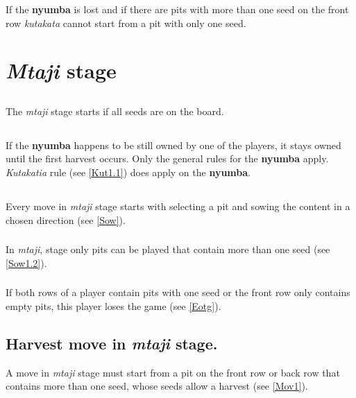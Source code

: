 \documentclass[12pt,a4paper]{article}
\begin{document}
\subsubsection{}\label{Kikuns3}
If the {\bf nyumba} is lost and if there are pits with more than one seed on the front row {\it kutakata} cannot start from a pit with only one seed.

\section{{\it Mtaji} stage}\label{Ms}

\subsection{}\label{Ms1} 
The {\it mtaji} stage starts if all seeds are on the board.
\subsection{}\label{Ms2} 
If the {\bf nyumba} happens to be still owned by one of the players, it stays owned until the first harvest occurs. Only the general rules for the {\bf nyumba} apply. {\it Kutakatia} rule (see \ref{Kut1.1}) does apply on the {\bf nyumba}.
\subsection{}\label{Ms3}
Every move in {\it mtaji} stage starts with selecting a pit and sowing the content in a chosen direction (see \ref{Sow}).

\subsubsection{}\label{Ms3.1} 
In {\it mtaji}, stage only pits can be played that contain more than one seed (see \ref{Sow1.2}).
\subsubsection{}\label{Ms3.2} 
If both rows of a player contain pits with one seed or the front row only contains empty pits, this player loses the game (see \ref{Eotg}).

\subsection{\bf Harvest move in {\it mtaji} stage.}\label{Hmims} 
A move in {\it mtaji} stage must start from a pit on the front row or back row that contains more than one seed, whose seeds allow a harvest (see \ref{Mov1}).
\end{document}
